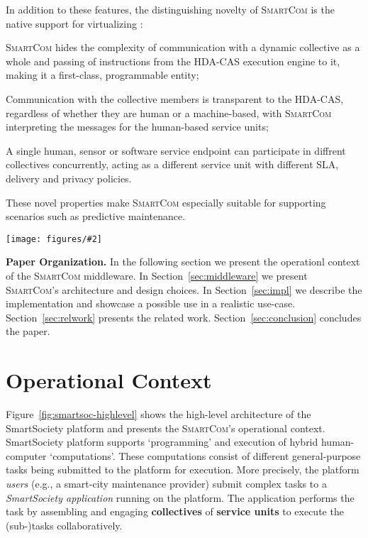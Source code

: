 \documentclass{llncs}
\newcommand{\mdl}{\textsc{SmartCom}}
\newcommand{\figtop}[3][0.9]{
\begin{figure*}[h]
\centering
\texttt{[image: figures/\#2]}
\caption{#3}
\label{fig:#2}
\end{figure*}
}
\begin{document}
	In addition to these features, the distinguishing novelty of \mdl{} is the native support for virtualizing : 
	\begin{inparaenum}[i) \itshape]
	\item
	\mdl{} hides the complexity of communication with a dynamic collective as a whole and passing of instructions from the HDA-CAS execution engine to it, making it a first-class, programmable entity; 
	\item 
	Communication with the collective members is transparent to the HDA-CAS, regardless of whether they are human or a machine-based, with \mdl{} interpreting the messages for the human-based service units; 
	\item 
	A single human, sensor or software service endpoint can participate in diffrent collectives concurrently, acting as a different service unit with different SLA, delivery and privacy policies. 
	\end{inparaenum}
	These novel properties make \mdl{} especially suitable for supporting scenarios such as predictive maintenance.


\figtop[.75]{smartsoc-highlevel}{Operational context for the \mdl{} middleware. Middleware components are marked in blue.}


\textbf{Paper Organization. }
  In the following section we present the operationl context of the \mdl{} middleware. In Section~\ref{sec:middleware} we present \mdl's architecture and design choices. In Section~\ref{sec:impl} we  describe the implementation and showcase a possible use in a realistic use-case. Section~\ref{sec:relwork} presents the related work. Section~\ref{sec:conclusion} concludes the paper.


  \section{Operational Context}
    \label{sec:intro:context}

      Figure~\ref{fig:smartsoc-highlevel} shows the high-level architecture of the SmartSociety platform and presents the \mdl's operational context. SmartSociety platform supports `programming' and execution of hybrid human-computer `computations'. These computations consist of different general-purpose tasks being submitted to the platform for execution. More precisely, the platform \emph{users} (e.g., a smart-city maintenance provider) submit complex tasks to a \emph{SmartSociety application} running on the platform. The application performs the task by assembling and engaging \textbf{collectives} of \textbf{service units} to execute the (sub-)tasks collaboratively.
\end{document}
